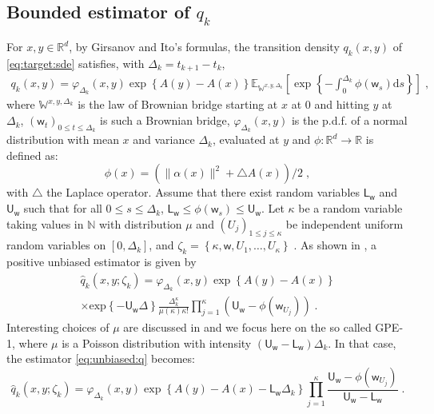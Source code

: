 \documentclass[12pt]{article}
\newcommand{\rmd}{\mathrm{d}}
\newcommand{\eqsp}{\;}
\newcommand{\1}{\mathrm{1}}
\newcommand{\mw}{\mathsf{w}}%
\newcommand{\U}{\mathsf{U}}
\newcommand{\Lo}{\mathsf{L}}
\begin{document}
\subsection*{Bounded estimator of $q_k$}
For $x, y \in \mathbb{R}^d$, by Girsanov and Ito's formulas, the transition density $q_k(x,y)$ of \eqref{eq:target:sde} satisfies, with $\Delta_k = t_{k+1}-t_k$,
\begin{align*}
q_k(x,y)=\varphi_{\Delta_k}(x,y)\exp\left\lbrace A(y)-A(x)\right\rbrace \mathbb{E}_{\mathbb{W}^{x,y,\Delta_k}}\left[ \exp \left\lbrace - \int_0^{\Delta_k} \phi(\mw_s)\rmd s \right\rbrace \right]\eqsp,
\end{align*}
where $\mathbb{W}^{x,y,\Delta_k}$ is the law of Brownian bridge starting at $x$ at 0 and hitting $y$ at $\Delta_k$, $(\mw_t)_{0\leq t \leq \Delta_k}$ is such a Brownian bridge, $\varphi_{\Delta_k}(x,y)$ is the p.d.f. of a normal distribution with mean $x$ and variance $\Delta_k$, evaluated at $y$ and $\phi:\mathbb{R}^d\to\mathbb{R}$ is defined as:
\[
\phi(x) =\left(\|\alpha(x)\|^2  + \triangle A(x)\right)/2\eqsp,
\]
with $\triangle$ the Laplace operator.
Assume that there exist random variables $\Lo_\mw$ and $\U_\mw$ such that for all $0\leq s \leq \Delta_k$, $\Lo_\mw \leq \phi(\mw_s)\leq \U_\mw$.
Let $\kappa$ be a random variable taking values in $\mathbb{N}$ with distribution $\mu$ and $(U_j)_{1\le j\le \kappa}$ be independent uniform random variables on $[0,\Delta_k]$, and $
\zeta_k = \left\{\kappa,\mw,U_1,\ldots,U_\kappa\right\}\eqsp$. 
As shown in \cite{fearnhead:papaspiliopoulos:roberts:2008}, a positive unbiased estimator is given by 
\begin{multline}
\widehat{q}_k(x,y;\zeta_k) = \varphi_{\Delta_k}(x,y) \exp \left\{A(y) - A(x)\right\}\\ 
\times\mathrm{exp}\left\{-\U_\mw\Delta\right\}\frac{\Delta_k^{\kappa}}{\mu(\kappa)\kappa!}\prod_{j=1}^{\kappa}\left(\U_\mw-\phi(\mw_{U_j})\right)\eqsp.\label{eq:unbiased:q}
\end{multline}
Interesting choices of $\mu$ are discussed in \cite{fearnhead:papaspiliopoulos:roberts:2008} and we focus here on the so called GPE-1, where $\mu$ is a Poisson distribution with intensity $(\U_\mw-\Lo_\mw)\Delta_k$. In that case, the estimator \eqref{eq:unbiased:q} becomes:
\begin{equation}
\widehat{q}_{k}(x,y;\zeta_k) = \varphi_{\Delta_k}(x,y) \exp \left\{A(y) - A(x)- \Lo_\mw\Delta_k \right\}\prod_{j=1}^{\kappa}\frac{\U_\mw-\phi(\mw_{U_j})}{\U_\mw-\Lo_\mw}\eqsp.\label{eq:GPE1}
\end{equation}
\end{document}
